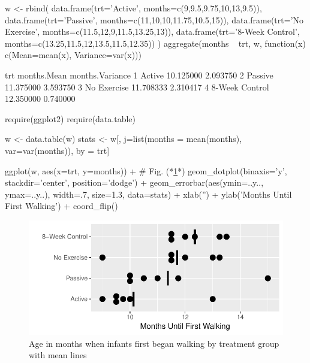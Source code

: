 \begin{Schunk}
\begin{Sinput}
w <- rbind(
  data.frame(trt='Active',      months=c(9,9.5,9.75,10,13,9.5)),
  data.frame(trt='Passive',     months=c(11,10,10,11.75,10.5,15)),
  data.frame(trt='No Exercise', months=c(11.5,12,9,11.5,13.25,13)),
  data.frame(trt='8-Week Control', months=c(13.25,11.5,12,13.5,11.5,12.35)) )
aggregate(months ~ trt, w, function(x) c(Mean=mean(x), Variance=var(x)))
\end{Sinput}
\begin{Soutput}
             trt months.Mean months.Variance
1         Active   10.125000        2.093750
2        Passive   11.375000        3.593750
3    No Exercise   11.708333        2.310417
4 8-Week Control   12.350000        0.740000
\end{Soutput}
\begin{Sinput}
require(ggplot2)
require(data.table)
\end{Sinput}
\begin{Sinput}
w <- data.table(w)
stats <- w[, j=list(months = mean(months), var=var(months)), by = trt]

ggplot(w, aes(x=trt, y=months)) +    # Fig. (*\ref{fig:multgroup-walking}*)
  geom_dotplot(binaxis='y', stackdir='center', position='dodge') +
  geom_errorbar(aes(ymin=..y.., ymax=..y..), width=.7, size=1.3,
                data=stats) +
  xlab('') + ylab('Months Until First Walking') + coord_flip()
\end{Sinput}
\begin{figure}[htbp]

\centerline{\includegraphics[width=\maxwidth]{multgroup-walking-1} }

\caption[Age of first walking]{Age in months when infants first began walking by treatment group with mean lines}\label{fig:multgroup-walking}
\end{figure}
\end{Schunk}
